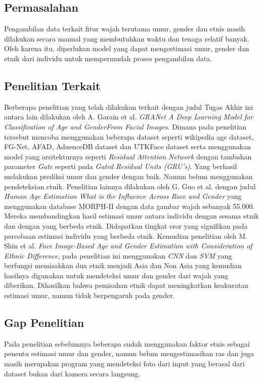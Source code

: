 \subsection{Permasalahan}

Pengambilan data terkait fitur wajah terutama umur, gender dan etnis masih dilakukan secara manual yang 
membutuhkan waktu dan tenaga relatif banyak. Oleh karena itu, diperlukan model yang dapat mengestimasi 
umur, gender dan etnik dari individu untuk mempermudah proses pengambilan data.

\subsection{Penelitian Terkait}

Berberapa penelitian yang telah dilakukan terkait dengan judul Tugas Akhir ini antara lain dilakukan oleh 
A. Garain et al. \textit{GRANet A Deep Learning Model for Classification of Age and GenderFrom Facial Images}. 
Dimana pada penelitian tersebut mencoba menggunakan beberapa dataset seperti wikipedia age dataset, 
FG-Net, AFAD, AduenceDB dataset dan UTKFace dataset serta menggunakan model yang arsitekturnya seperti 
\textit{Residual Attention Network} dengan tambahan parameter \textit{Gate} seperti pada \textit{Gated Residual Units (GRU’s)}. 
Yang berhasil melakukan prediksi umur dan gender dengan baik. Namun belum menggunakan pendeteksian etnik\citep{Granet}. 
Penelitian lainnya dilakukan oleh G. Guo et al. dengan judul \textit{Human Age Estimation What is the Influence 
Across Race and Gender} yang menggunakan database MORPH-II dengan data gambar wajah sebanyak 55.000. 
Mereka membandingkan hasil estimasi umur antara individu dengan sesama etnik dan dengan yang berbeda 
etnik. Didapatkan tingkat eror yang signifikan pada percobaan estimasi individu  yang  berbeda etnik\citep{AgeGender}. 
Kemudian penelitian oleh M. Shin et al. \textit{Face Image-Based Age and Gender Estimation with Consideration of 
Ethnic Difference}, pada penelitian ini menggunakan \textit{CNN} dan \textit{SVM} yang berfungsi memisahkan dua etnik 
menjadi Asia dan Non Asia yang kemudian hasilnya digunakan untuk mendeteksi umur dan gender dari wajah 
yang diberikan. Dihasilkan bahwa pemisahan etnik dapat meningkatkan keakuratan estimasi umur, namun tidak 
berpengaruh pada gender\citep{HumanAgeEst}.

\subsection{Gap Penelitian}
Pada penelitian sebelumnya beberapa sudah menggunakan faktor etnis sebagai penentu estimasi umur dan 
gender, namun belum mengestimasikan ras dan juga masih merupakan program yang mendeteksi foto dari input 
yang berasal dari dataset bukan dari kamera secara langsung.

